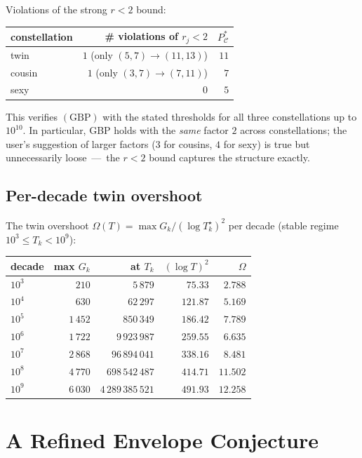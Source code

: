 \documentclass[11pt]{article}
\begin{document}
Violations of the strong $r<2$ bound:

\begin{center}
\begin{tabular}{lrr}
\toprule
constellation & \# violations of $r_j<2$ & $P^{*}_\mathcal{C}$ \\
\midrule
twin & $1$ (only $(5,7)\!\to\!(11,13)$) & $11$ \\
cousin & $1$ (only $(3,7)\!\to\!(7,11)$) & $7$ \\
sexy & $0$ & $5$ \\
\bottomrule
\end{tabular}
\end{center}

This verifies $(\mathrm{GBP})$ with the stated thresholds for all
three constellations up to $10^{10}$. In particular, GBP holds with
the \emph{same} factor $2$ across constellations; the user's
suggestion of larger factors ($3$ for cousins, $4$ for sexy) is
true but unnecessarily loose~---~the $r<2$ bound captures the
structure exactly.

\subsection{Per-decade twin overshoot}

The twin overshoot
$\Omega(T)=\max G_k/(\log T_k^{\star})^2$ per decade (stable regime
$10^3\!\le\!T_k\!<\!10^9$):

\begin{center}
\begin{tabular}{lrrrr}
\toprule
decade & max $G_k$ & at $T_k$ & $(\log T)^2$ & $\Omega$ \\
\midrule
$10^3$ & $210$ & $5\,879$ & $75.33$ & $2.788$ \\
$10^4$ & $630$ & $62\,297$ & $121.87$ & $5.169$ \\
$10^5$ & $1\,452$ & $850\,349$ & $186.42$ & $7.789$ \\
$10^6$ & $1\,722$ & $9\,923\,987$ & $259.55$ & $6.635$ \\
$10^7$ & $2\,868$ & $96\,894\,041$ & $338.16$ & $8.481$ \\
$10^8$ & $4\,770$ & $698\,542\,487$ & $414.71$ & $11.502$ \\
$10^9$ & $6\,030$ & $4\,289\,385\,521$ & $491.93$ & $12.258$ \\
\bottomrule
\end{tabular}
\end{center}

\section{A Refined Envelope Conjecture}\label{sec:envelope}
\end{document}
